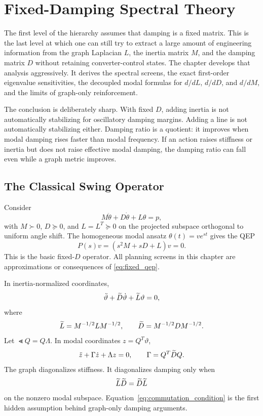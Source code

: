 \chapter{Fixed-Damping Spectral Theory}

The first level of the hierarchy assumes that damping is a fixed matrix. This
is the last level at which one can still try to extract a large amount of
engineering information from the graph Laplacian \(L\), the inertia matrix
\(M\), and the damping matrix \(D\) without retaining converter-control
states. The chapter develops that analysis aggressively. It derives the
spectral screens, the exact first-order eigenvalue sensitivities, the
decoupled modal formulas for \(d/dL\), \(d/dD\), and \(d/dM\), and the limits
of graph-only reinforcement.

The conclusion is deliberately sharp. With fixed \(D\), adding inertia is not
automatically stabilizing for oscillatory damping margins. Adding a line is not
automatically stabilizing either. Damping ratio is a quotient: it improves when
modal damping rises faster than modal frequency. If an action raises stiffness
or inertia but does not raise effective modal damping, the damping ratio can
fall even while a graph metric improves.

\section{The Classical Swing Operator}

Consider
\begin{equation}
  M\ddot\theta+D\dot\theta+L\theta=p,
  \label{eq:fixed_swing}
\end{equation}
with \(M\succ0\), \(D\succeq0\), and \(L=L^T\succeq0\) on the projected
subspace orthogonal to uniform angle shift. The homogeneous modal ansatz
\(\theta(t)=ve^{st}\) gives the QEP
\begin{equation}
  P(s)v=(s^2M+sD+L)v=0.
  \label{eq:fixed_qep}
\end{equation}
This is the basic fixed-\(D\) operator. All planning screens in this chapter
are approximations or consequences of \eqref{eq:fixed_qep}.

In inertia-normalized coordinates,
\begin{equation}
  \ddot\vartheta+\widetilde D\dot\vartheta+\widetilde L\vartheta=0,
  \label{eq:fixed_normalized}
\end{equation}
where
\begin{equation}
  \widetilde L=M^{-1/2}LM^{-1/2},\qquad
  \widetilde D=M^{-1/2}DM^{-1/2}.
\end{equation}
Let \(\Lt Q=Q\Lambda\). In modal coordinates \(z=Q^T\vartheta\),
\begin{equation}
  \ddot z+\Gamma \dot z+\Lambda z=0,\qquad
  \Gamma=Q^T\widetilde D Q.
  \label{eq:fixed_modal}
\end{equation}
The graph diagonalizes stiffness. It diagonalizes damping only when
\begin{equation}
  \widetilde L\widetilde D=\widetilde D\widetilde L
  \label{eq:commutation_condition}
\end{equation}
on the nonzero modal subspace. Equation~\eqref{eq:commutation_condition} is the
first hidden assumption behind graph-only damping arguments.

